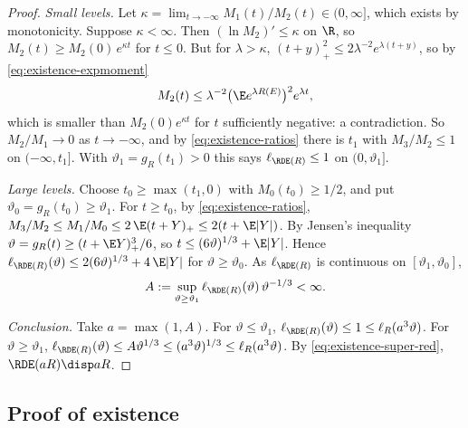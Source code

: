 \begin{proof}
\emph{Small levels.} Let $\kappa=\lim_{t\to-\infty}M_1(t)/M_2(t)\in(0,\infty]$, which exists by
monotonicity. Suppose $\kappa<\infty$. Then $(\ln M_2)'\le\kappa$ on $\R$, so
$M_2(t)\ge M_2(0)\,e^{\kappa t}$ for $t\le0$. But for $\lambda>\kappa$,
$(t+y)_+^2\le2\lambda^{-2}e^{\lambda(t+y)}$, so by \eqref{eq:existence-expmoment}
\[
  M_2(t)\le\lambda^{-2}\bigl(\E e^{\lambda R(E)}\bigr)^2e^{\lambda t},
\]
which is smaller than $M_2(0)e^{\kappa t}$ for $t$ sufficiently negative: a contradiction. So
$M_2/M_1\to0$ as $t\to-\infty$, and by \eqref{eq:existence-ratios} there is $t_1$ with
$M_3/M_2\le1$ on $(-\infty,t_1]$. With $\vartheta_1=g_R(t_1)>0$ this says
$\ell_{\RDE(R)}\le1$ on $(0,\vartheta_1]$.

\emph{Large levels.} Choose $t_0\ge\max(t_1,0)$ with $M_0(t_0)\ge1/2$, and put
$\vartheta_0=g_R(t_0)\ge\vartheta_1$. For $t\ge t_0$, by \eqref{eq:existence-ratios},
$M_3/M_2\le M_1/M_0\le2\,\E(t+Y)_+\le2(t+\E|Y|)$. By Jensen's inequality
$\vartheta=g_R(t)\ge(t+\E Y)_+^3/6$, so $t\le(6\vartheta)^{1/3}+\E|Y|$. Hence
$\ell_{\RDE(R)}(\vartheta)\le2(6\vartheta)^{1/3}+4\,\E|Y|$ for $\vartheta\ge\vartheta_0$. As
$\ell_{\RDE(R)}$ is continuous on $[\vartheta_1,\vartheta_0]$,
\[
  A:=\sup_{\vartheta\ge\vartheta_1}\ell_{\RDE(R)}(\vartheta)\,\vartheta^{-1/3}<\infty .
\]

\emph{Conclusion.} Take $a=\max(1,A)$. For $\vartheta\le\vartheta_1$,
$\ell_{\RDE(R)}(\vartheta)\le1\le\ell_R(a^3\vartheta)$. For $\vartheta\ge\vartheta_1$,
$\ell_{\RDE(R)}(\vartheta)\le A\vartheta^{1/3}\le(a^3\vartheta)^{1/3}\le\ell_R(a^3\vartheta)$.
By \eqref{eq:existence-super-red}, $\RDE(aR)\disp aR$.
\end{proof}

\subsection{Proof of existence}\label{subsec:existence-proof}


